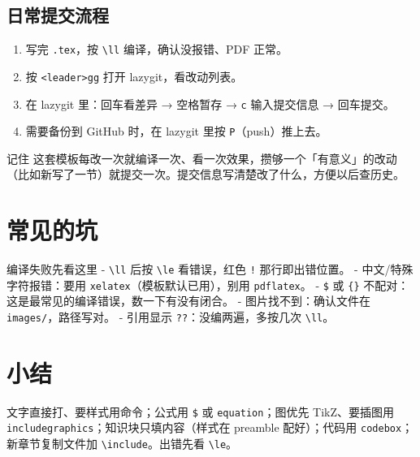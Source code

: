\subsection{日常提交流程}

\begin{enumerate}
  \item 写完 \texttt{.tex}，按 \texttt{\textbackslash ll} 编译，确认没报错、PDF 正常。
  \item 按 \texttt{\textless leader\textgreater gg} 打开 lazygit，看改动列表。
  \item 在 lazygit 里：回车看差异 → 空格暂存 → \texttt{c} 输入提交信息 → 回车提交。
  \item 需要备份到 GitHub 时，在 lazygit 里按 \texttt{P}（push）推上去。
\end{enumerate}

\begin{notebox}[tl]{记住}
这套模板每改一次就编译一次、看一次效果，攒够一个「有意义」的改动（比如新写了一节）就提交一次。提交信息写清楚改了什么，方便以后查历史。
\end{notebox}

\section{常见的坑}

\begin{notebox}[gy]{编译失败先看这里}
- \texttt{\textbackslash ll} 后按 \texttt{\textbackslash le} 看错误，红色 \texttt{!} 那行即出错位置。
- 中文/特殊字符报错：要用 \texttt{xelatex}（模板默认已用），别用 \texttt{pdflatex}。
- \texttt{\$} 或 \texttt{\{\}} 不配对：这是最常见的编译错误，数一下有没有闭合。
- 图片找不到：确认文件在 \texttt{images/}，路径写对。
- 引用显示 \texttt{??}：没编两遍，多按几次 \texttt{\textbackslash ll}。
\end{notebox}

\section{小结}

文字直接打、要样式用命令；公式用 \texttt{\$} 或 \texttt{equation}；图优先 TikZ、要插图用 \texttt{includegraphics}；知识块只填内容（样式在 preamble 配好）；代码用 \texttt{codebox}；新章节复制文件加 \texttt{\textbackslash include}。出错先看 \texttt{\textbackslash le}。
